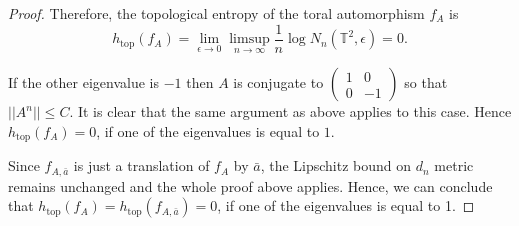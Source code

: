 \documentclass[10pt,a4paper]{amsart}
\begin{document}
\begin{proof}
Therefore, the topological entropy of the toral automorphism $f_A$ is
\[
h_{\mathrm{top}}(f_A)
=
\lim\limits_{\epsilon \to 0}
\limsup_{n \to \infty}
\frac{1}{n}\log N_n(\mathbb{T}^2,\epsilon)
= 0 .
\]

If the other eigenvalue is $-1$ then $A$ is conjugate to 
$\begin{pmatrix}
1 & 0\\
0 & -1
\end{pmatrix}$ so that $||A^n||\leq C$. It is clear that the same argument as above applies to this case. Hence $h_{\mathrm{top}}(f_{A})=0$, if one of the eigenvalues is equal to $1$. 

Since $f_{A,\bar{a}}$ is just a translation of $f_A$ by $\bar{a}$, the Lipschitz bound on $d_n$ metric remains unchanged and the whole proof above applies. Hence, we can conclude that $h_{\mathrm{top}}(f_A)=h_{\mathrm{top}}(f_{A,\bar{a}})=0$, if one of the eigenvalues is equal to 1.

\end{proof}
\end{document}
